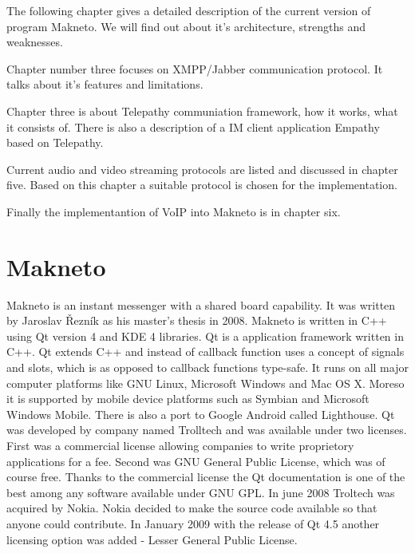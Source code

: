 The following chapter gives a detailed description of the current version of program Makneto. We will find out about it's architecture, strengths and weaknesses. 

Chapter number three focuses on XMPP/Jabber communication protocol. It talks about it's features and limitations. 

Chapter three is about Telepathy communiation framework, how it works, what it consists of. There is also a description of a IM client application Empathy based on Telepathy. 

Current audio and video streaming protocols are listed and discussed in chapter five. Based on this chapter a suitable protocol is chosen for the implementation.

Finally the implementantion of VoIP into Makneto is in chapter six.  


\chapter{Makneto}
Makneto is an instant messenger with a shared board capability. It was written by Jaroslav Řezník as his master's thesis in 2008. Makneto is written in C++ using Qt version 4 and KDE 4 libraries. Qt is a application framework written in C++. Qt extends C++ and instead of callback function uses a concept of signals and slots, which is as opposed to callback functions type-safe. It runs on all major computer platforms like GNU Linux, Microsoft Windows and Mac OS X. Moreso it is supported by mobile device platforms such as Symbian and Microsoft Windows Mobile. There is also a port to Google Android called Lighthouse. Qt was developed by company named Trolltech and was available under two licenses. First was a commercial license allowing companies to write proprietory applications for a fee. Second was GNU General Public License, which was of course free. Thanks to the commercial license the Qt documentation is one of the best among any software available under GNU GPL. In june 2008 Troltech was acquired by Nokia. Nokia decided to make the source code available so that anyone could contribute. In January 2009 with the release of Qt 4.5 another licensing option was added - Lesser General Public License.\cite{wikiQt}\cite{Qt}

